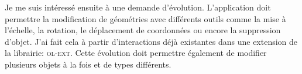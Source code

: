 \documentclass{rapportUHA40}
\begin{document}
Je me suis intéressé ensuite à une demande d'évolution. L'application doit
permettre la modification de géométries avec différents outils comme la mise à
l'échelle, la rotation, le déplacement de coordonnées ou encore la suppression
d'objet. J'ai fait cela à partir d'interactions déjà existantes dans une
extension de la librairie: \textsc{ol-ext}. Cette évolution doit permettre
également de modifier plusieurs objets à la fois et de types différents.




\end{document}
